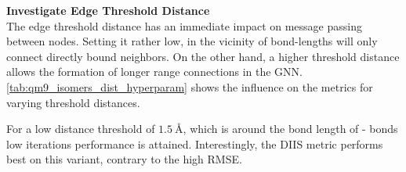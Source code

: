 \textbf{Investigate Edge Threshold Distance}\\
The edge threshold distance has an immediate impact on message passing between nodes. Setting it rather low, in the vicinity of bond-lengths will only connect directly bound neighbors. On the other hand, a higher threshold distance allows the formation of longer range connections in the GNN. \autoref{tab:qm9_isomers_dist_hyperparam} shows the influence on the metrics for varying threshold distances.  
\begin{table}[h]
    \centering
    \caption[GNN on QM9 isomers with different edge threshold distances]{GNN using different edge threshold distances (numbers denoted in $\unit{\angstrom}$) on QM9  isomers test set. Other hyperparameters are set according to \autoref{tab:init_hparams}}
    \label{tab:qm9_isomers_dist_hyperparam}
\end{table}
For a low distance threshold of $\SI{1.5}{\angstrom}$, which is around the bond length of - bonds low iterations performance is attained. Interestingly, the DIIS metric performs best on this variant, contrary to the high RMSE. 

